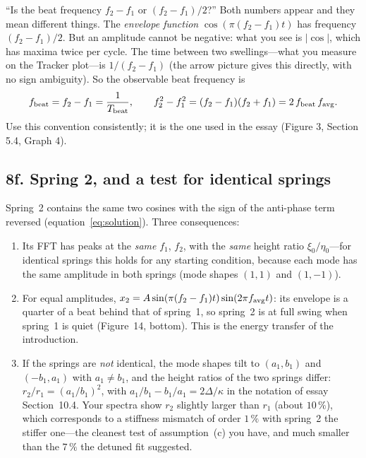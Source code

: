\documentclass[11pt,a4paper]{article}
\begin{document}
\begin{pitfall}
``Is the beat frequency $f_2-f_1$ or $(f_2-f_1)/2$?'' Both numbers appear and they mean different things. The \emph{envelope function} $\cos(\pi(f_2-f_1)t)$ has frequency $(f_2-f_1)/2$. But an amplitude cannot be negative: what you see is $|\cos|$, which has maxima twice per cycle. The time between two swellings---what you measure on the Tracker plot---is $1/(f_2-f_1)$ (the arrow picture gives this directly, with no sign ambiguity). So the observable beat frequency is
\[
f_{\rm beat}=f_2-f_1=\frac1{T_{\rm beat}},\qquad
f_2^2-f_1^2=(f_2-f_1)(f_2+f_1)=2\,f_{\rm beat}\,f_{\rm avg}.
\]
Use this convention consistently; it is the one used in the essay (Figure 3, Section 5.4, Graph 4).
\end{pitfall}

\subsection*{8f. Spring 2, and a test for identical springs}

Spring~2 contains the same two cosines with the sign of the anti-phase term reversed (equation~\eqref{eq:solution}). Three consequences:
\begin{enumerate}[nosep,leftmargin=1.6em]
\item Its FFT has peaks at the \emph{same} $f_1$, $f_2$, with the \emph{same} height ratio $\xi_0/\eta_0$---for identical springs this holds for any starting condition, because each mode has the same amplitude in both springs (mode shapes $(1,1)$ and $(1,-1)$).
\item For equal amplitudes, $x_2=A\sin(\pi(f_2-f_1)t)\sin(2\pi f_{\rm avg}t)$: its envelope is a quarter of a beat behind that of spring~1, so spring~2 is at full swing when spring~1 is quiet (Figure~14, bottom). This is the energy transfer of the introduction.
\item If the springs are \emph{not} identical, the mode shapes tilt to $(a_1,b_1)$ and $(-b_1,a_1)$ with $a_1\neq b_1$, and the height ratios of the two springs differ: $r_2/r_1=(a_1/b_1)^2$, with $a_1/b_1-b_1/a_1=2\Delta/\kappa$ in the notation of essay Section~10.4. Your spectra show $r_2$ slightly larger than $r_1$ (about $10\,\%$), which corresponds to a stiffness mismatch of order $1\,\%$ with spring~2 the stiffer one---the cleanest test of assumption~(c) you have, and much smaller than the $7\,\%$ the detuned fit suggested.
\end{enumerate}
\end{document}
